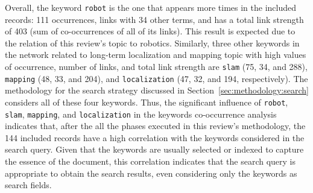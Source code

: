 Overall, the keyword \texttt{robot} is the one that appears more times in the included records: 111 occurrences, links with 34 other terms, and has a total link strength of 403 (sum of co-occurrences of all of its links). This result is expected due to the relation of this review's topic to robotics.
Similarly, three other keywords in the network related to long-term localization and mapping topic with high values of occurrence, number of links, and total link strength are \texttt{slam} (75, 34, and 288), \texttt{mapping} (48, 33, and 204), and \texttt{localization} (47, 32, and 194, respectively). The methodology for the search strategy discussed in Section~\ref{sec:methodology:search} considers all of these four keywords. Thus, the significant influence of \texttt{robot}, \texttt{slam}, \texttt{mapping}, and \texttt{localization} in the keywords co-occurrence analysis indicates that, after the all the phases executed in this review's methodology, the 144 included records have a high correlation with the keywords considered in the search query. Given that the keywords are usually selected or indexed to capture the essence of the document, this correlation indicates that the search query is appropriate to obtain the search results, even considering only the keywords as search fields.

